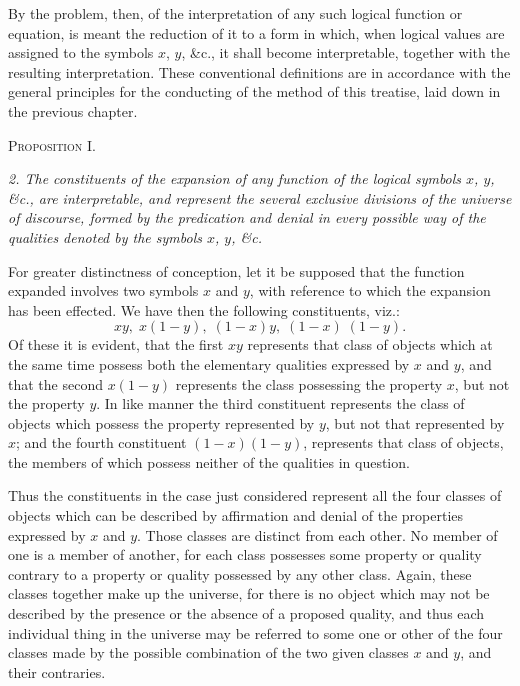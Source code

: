 \documentclass[oneside]{book}
\begin{document}
By the problem, then, of the interpretation of any such logical
function or equation, is meant the reduction of it to a form in
which, when logical values are assigned to the symbols $x$, $y$, \&c.,
it shall become interpretable, together with the resulting interpretation.
These conventional definitions are in accordance with
the general principles for the conducting of the method of this
treatise, laid down in the previous chapter.


\begin{center}
\textsc{Proposition I.}
\end{center}

\textit{2. The constituents of the expansion of any function of the logical
symbols $x$, $y$, \&c., are interpretable, and represent the several
exclusive divisions of the universe of discourse, formed by the predication
and denial in every possible way of the qualities denoted by the
symbols $x$, $y$, \&c.}

For greater distinctness of conception, let it be supposed that
the function expanded involves two symbols $x$ and $y$, with reference
to which the expansion has been effected. We have then
the following constituents, viz.:
\[
xy,\; x\left(1-y\right),\; \left(1-x\right)y,\; \left(1-x\right)\; \left(1-y\right).
\]
Of these it is evident, that the first $xy$ represents that class
of objects which at the same time possess both the elementary
qualities expressed by $x$ and $y$, and that the second $x\left(1-y\right)$ represents
the class possessing the property $x$, but not the property
$y$. In like manner the third constituent represents the class of
objects which possess the property represented by $y$, but not
that represented by $x$; and the fourth constituent $\left(1-x\right)\left(1-y\right)$,
represents that class of objects, the members of which possess neither
of the qualities in question.

Thus the constituents in the case just considered represent
all the four classes of objects which can be described by affirmation
and denial of the properties expressed by $x$ and $y$. Those
classes are distinct from each other. No member of one is a member
of another, for each class possesses some property or quality
contrary to a property or quality possessed by any other class.
Again, these classes together make up the universe, for there is
no object which may not be described by the presence or the
absence of a proposed quality, and thus each individual thing in
the universe may be referred to some one or other of the four
classes made by the possible combination of the two given
classes $x$ and $y$, and their contraries.
\end{document}
